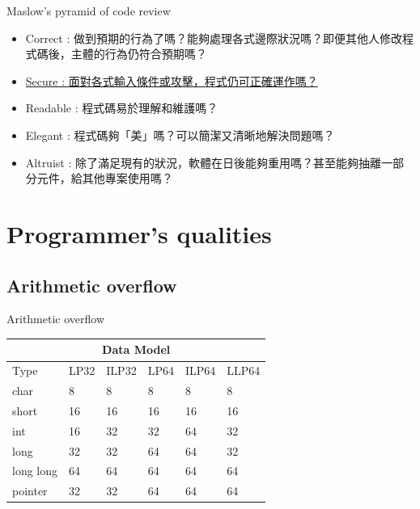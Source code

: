 \documentclass{beamer}
\begin{document}
\begin{CJK*}{UTF8}{bsmi}
    \begin{frame}{Maslow’s pyramid of code review}
        \begin{itemize}
            \item  Correct  : 做到預期的行為了嗎？能夠處理各式邊際狀況嗎？即便其他人修改程式碼後，主體的行為仍符合預期嗎？
            \item  \underline{Secure : 面對各式輸入條件或攻擊，程式仍可正確運作嗎？}
            \item  Readable : 程式碼易於理解和維護嗎？
            \item  Elegant  : 程式碼夠「美」嗎？可以簡潔又清晰地解決問題嗎？
            \item  Altruist : 除了滿足現有的狀況，軟體在日後能夠重用嗎？甚至能夠抽離一部分元件，給其他專案使用嗎？
        \end{itemize}
    \end{frame}

    \section{Programmer's qualities}

    \subsection{Arithmetic overflow}
    \begin{frame}{Arithmetic overflow}
        \centering
        \begin{tabular}{ |p{2cm}||p{1cm}|p{1cm}|p{1cm}|p{1cm}|p{1cm}|  }
            \hline
            \multicolumn{6}{|c|}{Data Model}                \\
            \hline
            Type      & LP32 & ILP32 & LP64 & ILP64 & LLP64 \\
            \hline
            char      & 8    & 8     & 8    & 8     & 8     \\
            short     & 16   & 16    & 16   & 16    & 16    \\
            int       & 16   & 32    & 32   & 64    & 32    \\
            long      & 32   & 32    & 64   & 64    & 32    \\
            long long & 64   & 64    & 64   & 64    & 64    \\
            pointer   & 32   & 32    & 64   & 64    & 64    \\
            \hline
        \end{tabular}
    \end{frame}


\end{CJK*}
\end{document}

